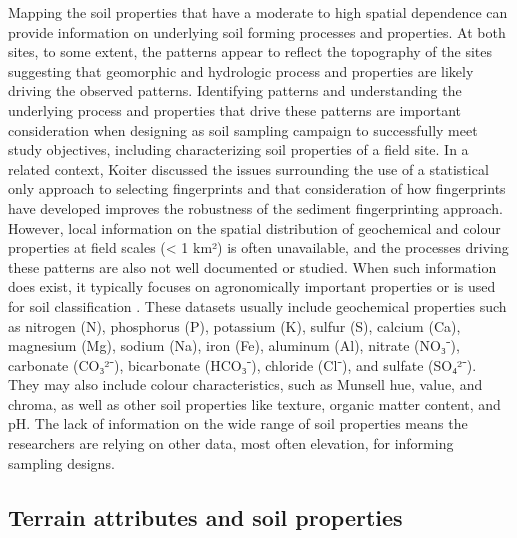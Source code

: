 \documentclass[
  number]{elsarticle}
\begin{document}
Mapping the soil properties that have a moderate to high spatial
dependence can provide information on underlying soil forming processes
and properties. At both sites, to some extent, the patterns appear to
reflect the topography of the sites suggesting that geomorphic and
hydrologic process and properties are likely driving the observed
patterns. Identifying patterns and understanding the underlying process
and properties that drive these patterns are important consideration
when designing as soil sampling campaign to successfully meet study
objectives, including characterizing soil properties of a field site. In
a related context, Koiter \citep{koiter2013a} discussed the issues
surrounding the use of a statistical only approach to selecting
fingerprints and that consideration of how fingerprints have developed
improves the robustness of the sediment fingerprinting approach.
However, local information on the spatial distribution of geochemical
and colour properties at field scales (\textless{} 1 km²) is often
unavailable, and the processes driving these patterns are also not well
documented or studied. When such information does exist, it typically
focuses on agronomically important properties \citep[e.g.,][]{mzuku2005}
or is used for soil classification
\citep[e.g.,][]{soilclassificationworkinggroup1998}. These datasets
usually include geochemical properties such as nitrogen (N), phosphorus
(P), potassium (K), sulfur (S), calcium (Ca), magnesium (Mg), sodium
(Na), iron (Fe), aluminum (Al), nitrate (NO₃⁻), carbonate (CO₃²⁻),
bicarbonate (HCO₃⁻), chloride (Cl⁻), and sulfate (SO₄²⁻). They may also
include colour characteristics, such as Munsell hue, value, and chroma,
as well as other soil properties like texture, organic matter content,
and pH. The lack of information on the wide range of soil properties
means the researchers are relying on other data, most often elevation,
for informing sampling designs.

\subsection{Terrain attributes and soil
properties}\label{terrain-attributes-and-soil-properties}
\end{document}
